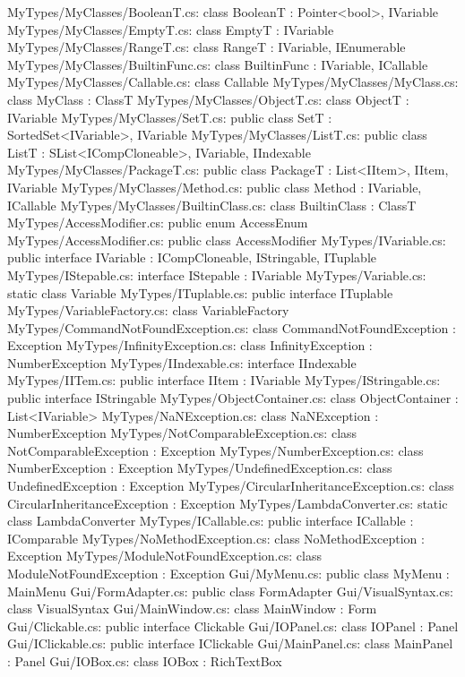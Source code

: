 MyTypes/MyClasses/BooleanT.cs:	class BooleanT : Pointer<bool>, IVariable 
MyTypes/MyClasses/EmptyT.cs:	class EmptyT : IVariable 
MyTypes/MyClasses/RangeT.cs:	class RangeT : IVariable, IEnumerable 
MyTypes/MyClasses/BuiltinFunc.cs:	class BuiltinFunc : IVariable, ICallable  
MyTypes/MyClasses/Callable.cs:	class Callable 
MyTypes/MyClasses/MyClass.cs:	class MyClass : ClassT 
MyTypes/MyClasses/ObjectT.cs:	class ObjectT : IVariable 
MyTypes/MyClasses/SetT.cs:	public class SetT : SortedSet<IVariable>, IVariable 
MyTypes/MyClasses/ListT.cs:	public class ListT : SList<ICompCloneable>, IVariable, IIndexable 
MyTypes/MyClasses/PackageT.cs:	public class PackageT : List<IItem>, IItem, IVariable 
MyTypes/MyClasses/Method.cs:	public class Method : IVariable, ICallable 
MyTypes/MyClasses/BuiltinClass.cs:	class BuiltinClass : ClassT 
MyTypes/AccessModifier.cs:	public enum AccessEnum 
MyTypes/AccessModifier.cs:	public class AccessModifier 
MyTypes/IVariable.cs:	public interface IVariable : ICompCloneable, IStringable, ITuplable 
MyTypes/IStepable.cs:	interface IStepable : IVariable 
MyTypes/Variable.cs:	static class Variable 
MyTypes/ITuplable.cs:	public interface ITuplable 
MyTypes/VariableFactory.cs:	class VariableFactory 
MyTypes/CommandNotFoundException.cs:	class CommandNotFoundException : Exception 
MyTypes/InfinityException.cs:	class InfinityException : NumberException 
MyTypes/IIndexable.cs:	interface IIndexable 
MyTypes/IITem.cs:	public interface IItem : IVariable 
MyTypes/IStringable.cs:	public interface IStringable 
MyTypes/ObjectContainer.cs:	class ObjectContainer : List<IVariable> 
MyTypes/NaNException.cs:	class NaNException : NumberException 
MyTypes/NotComparableException.cs:	class NotComparableException : Exception 
MyTypes/NumberException.cs:	class NumberException : Exception 
MyTypes/UndefinedException.cs:	class UndefinedException : Exception 
MyTypes/CircularInheritanceException.cs:	class CircularInheritanceException : Exception 
MyTypes/LambdaConverter.cs:	static class LambdaConverter 
MyTypes/ICallable.cs:	public interface ICallable : IComparable 
MyTypes/NoMethodException.cs:	class NoMethodException : Exception 
MyTypes/ModuleNotFoundException.cs:	class ModuleNotFoundException : Exception 
Gui/MyMenu.cs:	public class MyMenu : MainMenu 
Gui/FormAdapter.cs:	public class FormAdapter 
Gui/VisualSyntax.cs:	class VisualSyntax 
Gui/MainWindow.cs:	class MainWindow : Form 
Gui/Clickable.cs:	public interface Clickable 
Gui/IOPanel.cs:	class IOPanel : Panel 
Gui/IClickable.cs:	public interface IClickable 
Gui/MainPanel.cs:	class MainPanel : Panel 
Gui/IOBox.cs:	class IOBox : RichTextBox 
